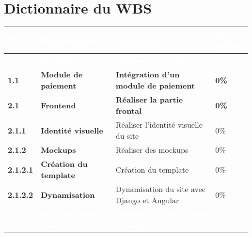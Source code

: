 \section{Dictionnaire du WBS}
\footnotesize
\begin{supertabular}{|p{2.2cm} p{6cm}|p{5cm}|R{2cm}|}
  \hline
  \textcolor{white}{\textbf{ID}} & \textcolor{white}{\textbf{Fonctionnalité}} & \textcolor{white}{\textbf{Description}} & \textcolor{white}{\textbf{\% réalisé}} \\
  \hline
  \hline


  \textcolor{white}{\textbf{1}} & \textcolor{white}{\textbf{Site Web}} & \textcolor{white}{\textbf{Réaliser le site web}} & \textcolor{white}{\textbf{0\%}} \\
  \hline

  \textbf{1.1}  & \textbf{Module de paiement} & \textbf{Intégration d'un module de paiement} & \textbf{0\%} \\
  \hline

  \textbf{2.1}  & \textbf{Frontend} & \textbf{Réaliser la partie frontal} & \textbf{0\%} \\
  \hline

  \hspace{6pt}
  \textbf{2.1.1}  & \textbf{Identité visuelle} & Réaliser l'identité visuelle du site & 0\% \\
  \hline

  \hspace{6pt}
  \textbf{2.1.2}  & \textbf{Mockups} & Réaliser des mockups & 0\% \\
  \hline

  \hspace{12pt}
  \textbf{2.1.2.1}  & \textbf{Création du template} & Création du template & 0\% \\
  \hline

  \hspace{12pt}
  \textbf{2.1.2.2}  & \textbf{Dynamisation} & Dynamisation du site avec Django et Angular & 0\% \\
  \hline




  \textcolor{white}{\textbf{2}}  & \textcolor{white}{\textbf{Programme de scan}} & \textcolor{white}{\textbf{Réaliser un programme de scan}} & \textcolor{white}{\textbf{0\%}} \\
  \hline



\end{supertabular}
